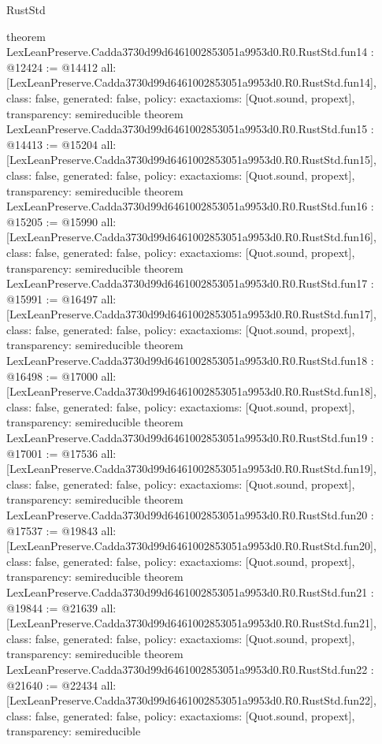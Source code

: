 \begin{lexlean}{RustStd}
\begin{coremodule}
{}
theorem LexLeanPreserve.Cadda3730d99d6461002853051a9953d0.R0.RustStd.fun14 : @12424 := @14412 {
  all: [LexLeanPreserve.Cadda3730d99d6461002853051a9953d0.R0.RustStd.fun14],
  class: false,
  generated: false,
  policy: exact{axioms: [Quot.sound, propext]},
  transparency: semireducible
}
theorem LexLeanPreserve.Cadda3730d99d6461002853051a9953d0.R0.RustStd.fun15 : @14413 := @15204 {
  all: [LexLeanPreserve.Cadda3730d99d6461002853051a9953d0.R0.RustStd.fun15],
  class: false,
  generated: false,
  policy: exact{axioms: [Quot.sound, propext]},
  transparency: semireducible
}
theorem LexLeanPreserve.Cadda3730d99d6461002853051a9953d0.R0.RustStd.fun16 : @15205 := @15990 {
  all: [LexLeanPreserve.Cadda3730d99d6461002853051a9953d0.R0.RustStd.fun16],
  class: false,
  generated: false,
  policy: exact{axioms: [Quot.sound, propext]},
  transparency: semireducible
}
theorem LexLeanPreserve.Cadda3730d99d6461002853051a9953d0.R0.RustStd.fun17 : @15991 := @16497 {
  all: [LexLeanPreserve.Cadda3730d99d6461002853051a9953d0.R0.RustStd.fun17],
  class: false,
  generated: false,
  policy: exact{axioms: [Quot.sound, propext]},
  transparency: semireducible
}
theorem LexLeanPreserve.Cadda3730d99d6461002853051a9953d0.R0.RustStd.fun18 : @16498 := @17000 {
  all: [LexLeanPreserve.Cadda3730d99d6461002853051a9953d0.R0.RustStd.fun18],
  class: false,
  generated: false,
  policy: exact{axioms: [Quot.sound, propext]},
  transparency: semireducible
}
theorem LexLeanPreserve.Cadda3730d99d6461002853051a9953d0.R0.RustStd.fun19 : @17001 := @17536 {
  all: [LexLeanPreserve.Cadda3730d99d6461002853051a9953d0.R0.RustStd.fun19],
  class: false,
  generated: false,
  policy: exact{axioms: [Quot.sound, propext]},
  transparency: semireducible
}
theorem LexLeanPreserve.Cadda3730d99d6461002853051a9953d0.R0.RustStd.fun20 : @17537 := @19843 {
  all: [LexLeanPreserve.Cadda3730d99d6461002853051a9953d0.R0.RustStd.fun20],
  class: false,
  generated: false,
  policy: exact{axioms: [Quot.sound, propext]},
  transparency: semireducible
}
theorem LexLeanPreserve.Cadda3730d99d6461002853051a9953d0.R0.RustStd.fun21 : @19844 := @21639 {
  all: [LexLeanPreserve.Cadda3730d99d6461002853051a9953d0.R0.RustStd.fun21],
  class: false,
  generated: false,
  policy: exact{axioms: [Quot.sound, propext]},
  transparency: semireducible
}
theorem LexLeanPreserve.Cadda3730d99d6461002853051a9953d0.R0.RustStd.fun22 : @21640 := @22434 {
  all: [LexLeanPreserve.Cadda3730d99d6461002853051a9953d0.R0.RustStd.fun22],
  class: false,
  generated: false,
  policy: exact{axioms: [Quot.sound, propext]},
  transparency: semireducible
}
\end{coremodule}
\end{lexlean}
